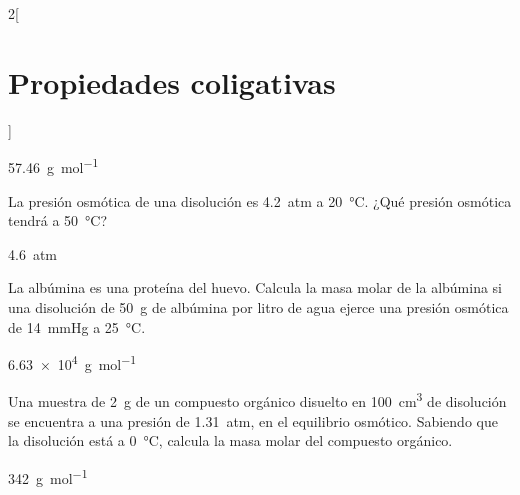 \documentclass[10pt]{article}
\begin{document}
\begin{multicols}{2}[
  \section{Propiedades coligativas}
  ]
  \begin{solution}
    \SI{57.46}{\gram\per\mole}
  \end{solution}




  \begin{exercise}[
      tags    = {termodinámica, entalpía, entalpia de reacción, calor},
      topics  = {química, termoquímica, termodinámica},
      source  = {FQ 1B OXF 2015, p79, e48},
    ]
    La presión osmótica de una disolución es \SI{4.2}{atm} a \SI{20}{\celsius}. ¿Qué presión osmótica tendrá a \SI{50}{\celsius}?
  \end{exercise}

  \begin{solution}
    \SI{4.6}{atm}
  \end{solution}




  \begin{exercise}[
      tags    = {termodinámica, entalpía, entalpia de reacción, calor},
      topics  = {química, termoquímica, termodinámica},
      source  = {FQ 1B SAN 2015, p94, e59},
    ]
    La albúmina es una proteína del huevo. Calcula la masa
    molar de la albúmina si una disolución de \SI{50}{\gram} de albúmina
    por litro de agua ejerce una presión osmótica de
    \SI{14}{\mmHg} a \SI{25}{\celsius}.
  \end{exercise}

  \begin{solution}
    \SI{6.63e4}{\gram\per\mole}
  \end{solution}




  \begin{exercise}[
      tags    = {termodinámica, entalpía, entalpia de reacción, calor},
      topics  = {química, termoquímica, termodinámica},
      source  = {FQ 1B OXF 2015, p79, e50},
    ]
    Una muestra de \SI{2}{\gram} de un compuesto orgánico disuelto en \SI{100}{\cubic\centi\meter} de disolución se encuentra a una presión de \SI{1.31}{atm}, en el equilibrio osmótico. Sabiendo que la disolución está a \SI{0}{\celsius}, calcula la masa molar del compuesto orgánico.
  \end{exercise}

  \begin{solution}
    \SI{342}{\gram\per\mole}
  \end{solution}
  \vfill\null
\end{multicols}
\end{document}
